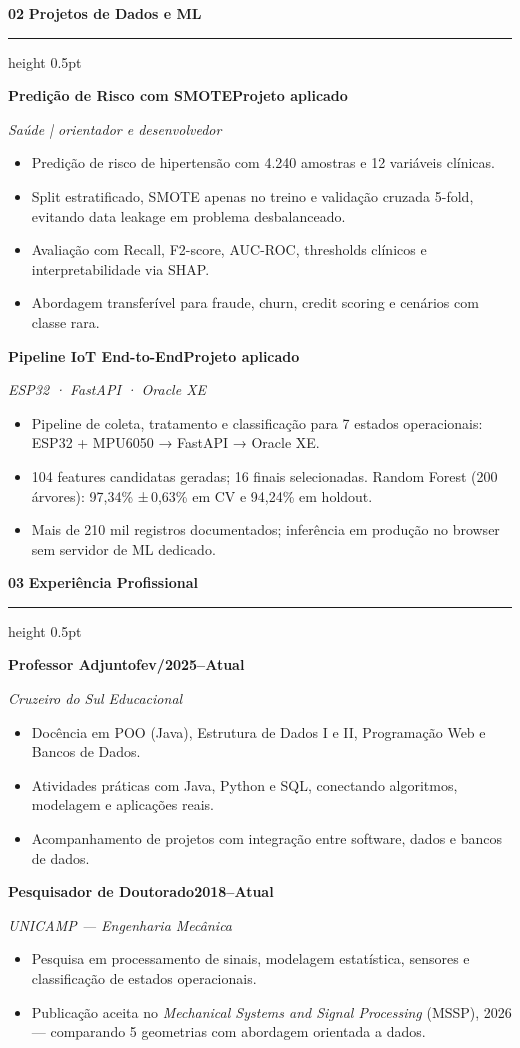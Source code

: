 \documentclass[10pt,a4paper]{article}
\newcommand{\cvsection}[2]{%
  \vspace{0.42em}
  {\footnotesize\bfseries\color{cvmuted}#1}\enspace
  {\large\bfseries\color{cvdark}#2}\par
  \vspace{0.04em}
  {\color{cvrule}\hrule height 0.5pt}
  \vspace{0.18em}
}
\newcommand{\entry}[4]{%
  \noindent\textbf{\color{cvdark}#1}\hfill{\small\bfseries\color{cvaccent}#2}\par
  {\small\itshape\color{cvmuted}#3}\par
  \vspace{0.04em}
  {\small #4}
  \vspace{0.12em}
}
\begin{document}
\cvsection{02}{Projetos de Dados e ML}

\entry{Predição de Risco com SMOTE}{Projeto aplicado}%
  {Saúde | orientador e desenvolvedor}{%
  \begin{itemize}
    \item Predição de risco de hipertensão com 4.240 amostras e 12 variáveis clínicas.
    \item Split estratificado, SMOTE apenas no treino e validação cruzada 5-fold, evitando data leakage em problema desbalanceado.
    \item Avaliação com Recall, F2-score, AUC-ROC, thresholds clínicos e interpretabilidade via SHAP.
    \item Abordagem transferível para fraude, churn, credit scoring e cenários com classe rara.
  \end{itemize}
}

\entry{Pipeline IoT End-to-End}{Projeto aplicado}%
  {ESP32 · FastAPI · Oracle XE}{%
  \begin{itemize}
    \item Pipeline de coleta, tratamento e classificação para 7 estados operacionais: ESP32 + MPU6050 → FastAPI → Oracle XE.
    \item 104 features candidatas geradas; 16 finais selecionadas. Random Forest (200 árvores): 97,34\% ±\,0,63\% em CV e 94,24\% em holdout.
    \item Mais de 210 mil registros documentados; inferência em produção no browser sem servidor de ML dedicado.
  \end{itemize}
}

\cvsection{03}{Experiência Profissional}

\entry{Professor Adjunto}{fev/2025--Atual}%
  {Cruzeiro do Sul Educacional}{%
  \begin{itemize}
    \item Docência em POO (Java), Estrutura de Dados I e II, Programação Web e Bancos de Dados.
    \item Atividades práticas com Java, Python e SQL, conectando algoritmos, modelagem e aplicações reais.
    \item Acompanhamento de projetos com integração entre software, dados e bancos de dados.
  \end{itemize}
}

\entry{Pesquisador de Doutorado}{2018--Atual}%
  {UNICAMP --- Engenharia Mecânica}{%
  \begin{itemize}
    \item Pesquisa em processamento de sinais, modelagem estatística, sensores e classificação de estados operacionais.
    \item Publicação aceita no \textit{Mechanical Systems and Signal Processing} (MSSP), 2026 --- comparando 5 geometrias com abordagem orientada a dados.
  \end{itemize}
}
\end{document}
